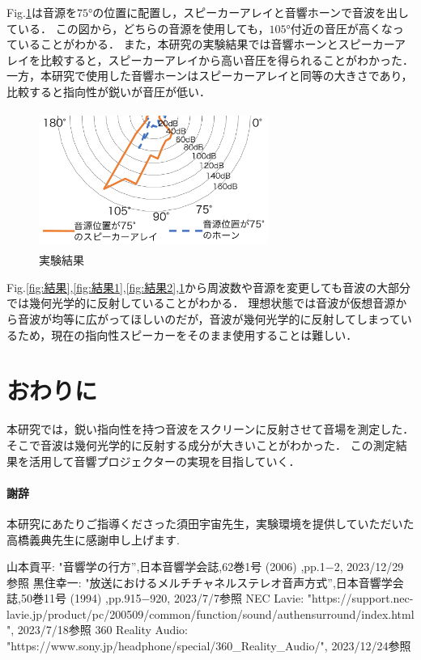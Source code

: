\documentclass[twocolumn,11pt,a4j]{ltjsarticle}
\begin{document}
\vspace{1ex}
Fig.\ref{fig:結果3}は音源を$\ang{75}$の位置に配置し，スピーカーアレイと音響ホーンで音波を出している．
この図から，どちらの音源を使用しても，$\ang{105}$付近の音圧が高くなっていることがわかる．
また，本研究の実験結果では音響ホーンとスピーカーアレイを比較すると，スピーカーアレイから高い音圧を得られることがわかった．
一方，本研究で使用した音響ホーンはスピーカーアレイと同等の大きさであり，比較すると指向性が鋭いが音圧が低い．


\vspace{1ex}
\begin{figure}[h]
\begin{center}
 \includegraphics[clip,width=75mm,height=45mm]{keltuka3.pdf}
\end{center}
 \caption{実験結果}
 \label{fig:結果3}
\end{figure}

\vspace{1ex}
Fig.\ref{fig:結果},\ref{fig:結果1},\ref{fig:結果2},\ref{fig:結果3}から周波数や音源を変更しても音波の大部分では幾何光学的に反射していることがわかる．
理想状態では音波が仮想音源から音波が均等に広がってほしいのだが，音波が幾何光学的に反射してしまっているため，現在の指向性スピーカーをそのまま使用することは難しい．

\vspace{1ex}
\section{おわりに}
本研究では，鋭い指向性を持つ音波をスクリーンに反射させて音場を測定した．
そこで音波は幾何光学的に反射する成分が大きいことがわかった．
この測定結果を活用して音響プロジェクターの実現を目指していく．

\vspace{1ex}
\paragraph{謝辞}
本研究にあたりご指導くださった須田宇宙先生，実験環境を提供していただいた高橋義典先生に感謝申し上げます.

\begin{thebibliography}{99}
 山本貢平: "音響学の行方'',日本音響学会誌,62巻1号 (2006) ,pp.1−2, 2023/12/29参照
 黒住幸一: "放送におけるメルチチャネルステレオ音声方式'',日本音響学会誌,50巻11号 (1994) ,pp.915−920, 2023/7/7参照
 NEC Lavie: "https://support.nec-lavie.jp/product/pc/200509/common/function/sound/authensurround/index.html", 2023/7/18参照
 360 Reality Audio: "https://www.sony.jp/headphone/special/360\_Reality\_Audio/", 2023/12/24参照

\end{thebibliography}
\end{document}
